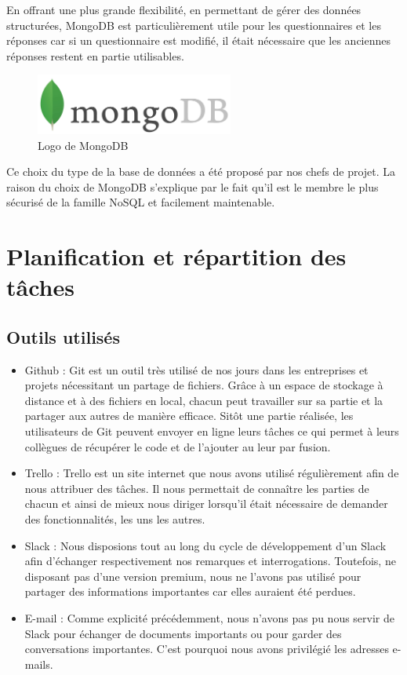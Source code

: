 En offrant une plus grande flexibilité, en permettant de gérer des données structurées, MongoDB est particulièrement utile pour les questionnaires et les réponses car si un questionnaire est modifié, il était nécessaire que les anciennes réponses restent en partie utilisables.

\begin{figure}[H]
    \begin{center}
    \includegraphics[height=2.0cm]{img/mongodb}
    \end{center}
    \caption{Logo de MongoDB}
\end{figure}

Ce choix du type de la base de données a été proposé par nos chefs de projet. La raison du choix de MongoDB s'explique par le fait qu'il est le membre le plus sécurisé de la famille NoSQL et facilement maintenable.   

\section{Planification et répartition des tâches}

\subsection{Outils utilisés}

\begin{itemize}
\item Github : 
Git est un outil très utilisé de nos jours dans les entreprises et projets nécessitant un partage de fichiers. Grâce à un espace de stockage à distance et à des fichiers en local, chacun peut travailler sur sa partie et la partager aux autres de manière efficace. Sitôt une partie réalisée, les utilisateurs de Git peuvent envoyer en ligne leurs tâches ce qui permet à leurs collègues de récupérer le code et de l'ajouter au leur par fusion.

\item Trello :
Trello est un site internet que nous avons utilisé régulièrement afin de nous attribuer des tâches. Il nous permettait de connaître les parties de chacun et ainsi de mieux nous diriger lorsqu'il était nécessaire de demander des fonctionnalités, les uns les autres.

\item Slack :
Nous disposions tout au long du cycle de développement d'un Slack afin d'échanger respectivement nos remarques et interrogations. Toutefois, ne disposant pas d'une version premium, nous ne l'avons pas utilisé pour partager des informations importantes car elles auraient été perdues.

\item E-mail :
Comme explicité précédemment, nous n'avons pas pu nous servir de Slack pour échanger de documents importants ou pour garder des conversations importantes. C'est pourquoi nous avons privilégié les adresses e-mails.

\end{itemize}



